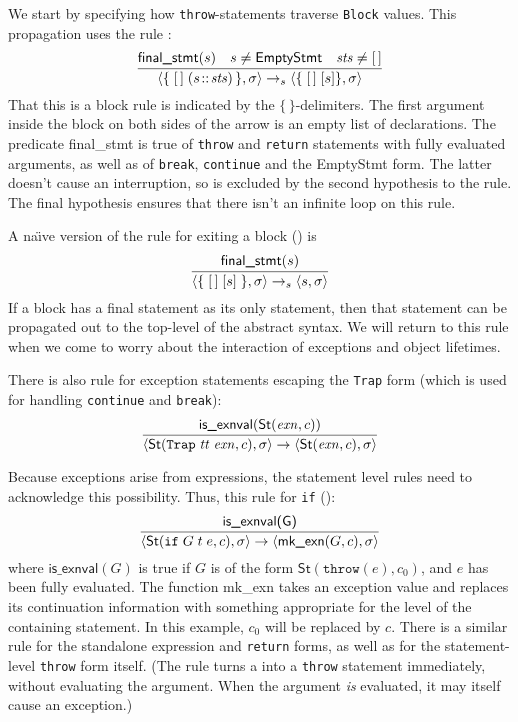 \documentclass[11pt]{article}
\newcommand{\naive}{na\"\i{}ve}
\begin{document}
We start by specifying how \texttt{throw}-statements traverse
\texttt{Block} values.  This propagation uses the rule
:
\[
\infer{
  \statebrack{
    \mathbf{\{} \;[\,] \;(s\!::\!\mathit{sts})\,\mathbf{\}},
    \sigma
  }
  \stmtarrow
  \statebrack{\mathbf{\{} \;[\,]\; [s]\mathbf{\}},\sigma}}{
  \textsf{final\_stmt}(s) & s \neq \textsf{EmptyStmt} & \mathit{sts}
  \neq [\,]}
\]
That this is a block rule is indicated by the
$\mathbf{\{\,\}}$-delimiters.  The first argument inside the block on
both sides of the arrow is an empty list of declarations.  The
predicate \textsf{final\_stmt} is true of \texttt{throw} and
\texttt{return} statements with fully evaluated arguments, as well as
of \texttt{break}, \texttt{continue} and the \textsf{EmptyStmt} form.
The latter doesn't cause an interruption, so is excluded by the second
hypothesis to the rule.  The final hypothesis ensures that there isn't
an infinite loop on this rule.

A \naive{} version of the rule for exiting a block
() is
\[
\infer{
  \statebrack{\mathbf{\{}\;[\,]\;[s]\;\mathbf{\}},\sigma}
  \stmtarrow
  \statebrack{s,\sigma}
}{
  \textsf{final\_stmt}(s)
}
\]
If a block has a final statement as its only statement, then that
statement can be propagated out to the top-level of the abstract
syntax. We will return to this rule when we come to worry about the
interaction of exceptions and object lifetimes.

There is also rule  for exception statements
escaping the \texttt{Trap} form (which is used for handling
\texttt{continue} and \texttt{break}):
\[
\infer{
  \statebrack{
    \textsf{St}(\texttt{Trap}\;\mathit{tt}\;\mathit{exn}, c), \sigma
  }
  \to
  \statebrack{\textsf{St}(\mathit{exn},c), \sigma}
}{\textsf{is\_exnval}(\textsf{St}(\mathit{exn},c))}
\]

\medskip
Because exceptions arise from expressions, the statement level rules
need to acknowledge this possibility.  Thus, this rule for
\texttt{if} ():
\[
\infer{
  \statebrack{\textsf{St}(\texttt{if}\;G\;t\;e, c), \sigma}
  \to
  \statebrack{\textsf{mk\_exn}(G,c),\sigma}
}{
  \textsf{is\_exnval(G)}
}
\]
where $\textsf{is\_exnval}(G)$ is true if $G$ is of the form
$\textsf{St}(\texttt{throw}(e), c_0)$, and $e$ has been fully
evaluated.  The function \textsf{mk\_exn} takes an exception value and
replaces its continuation information with something appropriate for
the level of the containing statement.  In this example, $c_0$ will be
replaced by $c$.  There is a similar rule for the standalone
expression and \texttt{return} forms, as well as for the
statement-level \texttt{throw} form itself.  (The rule
 turns a \ethrow{} into a \texttt{throw}
statement immediately, without evaluating the argument.  When the
argument \emph{is} evaluated, it may itself cause an exception.)
\end{document}
